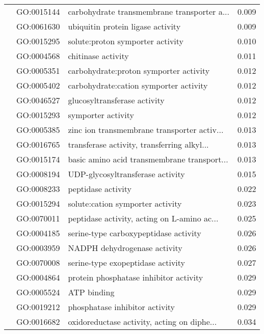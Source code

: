 \begin{longtable}{lllr}
   & GO:0015144 &  carbohydrate transmembrane transporter a... &         0.009 \\
   & GO:0061630 &            ubiquitin protein ligase activity &         0.009 \\
   & GO:0015295 &             solute:proton symporter activity &         0.010 \\
   & GO:0004568 &                           chitinase activity &         0.011 \\
   & GO:0005351 &       carbohydrate:proton symporter activity &         0.012 \\
   & GO:0005402 &       carbohydrate:cation symporter activity &         0.012 \\
   & GO:0046527 &                 glucosyltransferase activity &         0.012 \\
   & GO:0015293 &                           symporter activity &         0.012 \\
   & GO:0005385 &  zinc ion transmembrane transporter activ... &         0.013 \\
   & GO:0016765 &  transferase activity, transferring alkyl... &         0.013 \\
   & GO:0015174 &  basic amino acid transmembrane transport... &         0.013 \\
   & GO:0008194 &             UDP-glycosyltransferase activity &         0.015 \\
   & GO:0008233 &                           peptidase activity &         0.022 \\
   & GO:0015294 &             solute:cation symporter activity &         0.023 \\
   & GO:0070011 &  peptidase activity, acting on L-amino ac... &         0.025 \\
   & GO:0004185 &        serine-type carboxypeptidase activity &         0.026 \\
   & GO:0003959 &                 NADPH dehydrogenase activity &         0.026 \\
   & GO:0070008 &            serine-type exopeptidase activity &         0.027 \\
   & GO:0004864 &       protein phosphatase inhibitor activity &         0.029 \\
   & GO:0005524 &                                  ATP binding &         0.029 \\
   & GO:0019212 &               phosphatase inhibitor activity &         0.029 \\
   & GO:0016682 &  oxidoreductase activity, acting on diphe... &         0.034 \\

\end{longtable}
